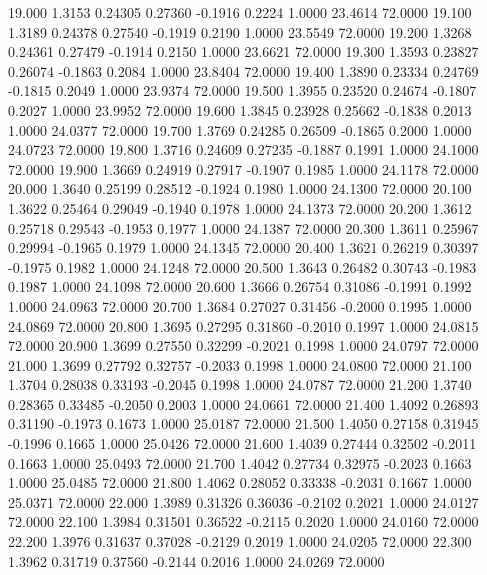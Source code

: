   19.000   1.3153   0.24305   0.27360  -0.1916   0.2224   1.0000  23.4614  72.0000
  19.100   1.3189   0.24378   0.27540  -0.1919   0.2190   1.0000  23.5549  72.0000
  19.200   1.3268   0.24361   0.27479  -0.1914   0.2150   1.0000  23.6621  72.0000
  19.300   1.3593   0.23827   0.26074  -0.1863   0.2084   1.0000  23.8404  72.0000
  19.400   1.3890   0.23334   0.24769  -0.1815   0.2049   1.0000  23.9374  72.0000
  19.500   1.3955   0.23520   0.24674  -0.1807   0.2027   1.0000  23.9952  72.0000
  19.600   1.3845   0.23928   0.25662  -0.1838   0.2013   1.0000  24.0377  72.0000
  19.700   1.3769   0.24285   0.26509  -0.1865   0.2000   1.0000  24.0723  72.0000
  19.800   1.3716   0.24609   0.27235  -0.1887   0.1991   1.0000  24.1000  72.0000
  19.900   1.3669   0.24919   0.27917  -0.1907   0.1985   1.0000  24.1178  72.0000
  20.000   1.3640   0.25199   0.28512  -0.1924   0.1980   1.0000  24.1300  72.0000
  20.100   1.3622   0.25464   0.29049  -0.1940   0.1978   1.0000  24.1373  72.0000
  20.200   1.3612   0.25718   0.29543  -0.1953   0.1977   1.0000  24.1387  72.0000
  20.300   1.3611   0.25967   0.29994  -0.1965   0.1979   1.0000  24.1345  72.0000
  20.400   1.3621   0.26219   0.30397  -0.1975   0.1982   1.0000  24.1248  72.0000
  20.500   1.3643   0.26482   0.30743  -0.1983   0.1987   1.0000  24.1098  72.0000
  20.600   1.3666   0.26754   0.31086  -0.1991   0.1992   1.0000  24.0963  72.0000
  20.700   1.3684   0.27027   0.31456  -0.2000   0.1995   1.0000  24.0869  72.0000
  20.800   1.3695   0.27295   0.31860  -0.2010   0.1997   1.0000  24.0815  72.0000
  20.900   1.3699   0.27550   0.32299  -0.2021   0.1998   1.0000  24.0797  72.0000
  21.000   1.3699   0.27792   0.32757  -0.2033   0.1998   1.0000  24.0800  72.0000
  21.100   1.3704   0.28038   0.33193  -0.2045   0.1998   1.0000  24.0787  72.0000
  21.200   1.3740   0.28365   0.33485  -0.2050   0.2003   1.0000  24.0661  72.0000
  21.400   1.4092   0.26893   0.31190  -0.1973   0.1673   1.0000  25.0187  72.0000
  21.500   1.4050   0.27158   0.31945  -0.1996   0.1665   1.0000  25.0426  72.0000
  21.600   1.4039   0.27444   0.32502  -0.2011   0.1663   1.0000  25.0493  72.0000
  21.700   1.4042   0.27734   0.32975  -0.2023   0.1663   1.0000  25.0485  72.0000
  21.800   1.4062   0.28052   0.33338  -0.2031   0.1667   1.0000  25.0371  72.0000
  22.000   1.3989   0.31326   0.36036  -0.2102   0.2021   1.0000  24.0127  72.0000
  22.100   1.3984   0.31501   0.36522  -0.2115   0.2020   1.0000  24.0160  72.0000
  22.200   1.3976   0.31637   0.37028  -0.2129   0.2019   1.0000  24.0205  72.0000
  22.300   1.3962   0.31719   0.37560  -0.2144   0.2016   1.0000  24.0269  72.0000
